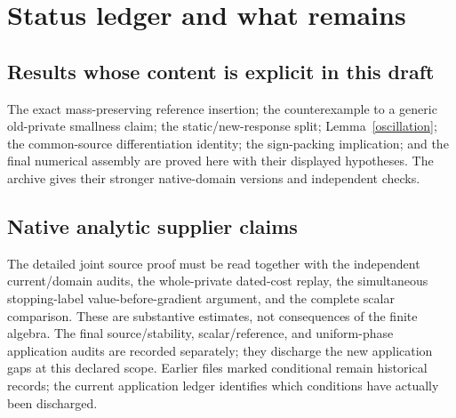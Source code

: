\documentclass[11pt]{article}
\theoremstyle{definition}\newtheorem{definition}[theorem]{Definition}
\theoremstyle{remark}\newtheorem{remark}[theorem]{Remark}
\begin{document}
\section{Status ledger and what remains}
\subsection{Results whose content is explicit in this draft}
The exact mass-preserving reference insertion; the counterexample to a generic old-private smallness claim; the static/new-response split; Lemma~\ref{oscillation}; the common-source differentiation identity; the sign-packing implication; and the final numerical assembly are proved here with their displayed hypotheses. The archive gives their stronger native-domain versions and independent checks.

\subsection{Native analytic supplier claims}
The detailed joint source proof must be read together with the independent current/domain audits, the whole-private dated-cost replay, the simultaneous stopping-label value-before-gradient argument, and the complete scalar comparison. These are substantive estimates, not consequences of the finite algebra. The final source/stability, scalar/reference, and uniform-phase application audits are recorded separately; they discharge the new application gaps at this declared scope. Earlier files marked conditional remain historical records; the current application ledger identifies which conditions have actually been discharged.
\end{document}
